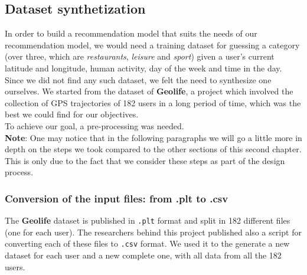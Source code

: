 \documentclass[../../main]{subfiles}
\begin{document}
\subsection{Dataset synthetization}
\label{ss:dataset-synthetization}

In order to build a recommendation model that suits the needs of our recommendation model, we would need a training dataset for guessing a category 
(over three, which are \textit{restaurants}, \textit{leisure} and \textit{sport}) given a user's current latitude and longitude, human activity, day of the week and time in the day.
Since we did not find any such dataset, we felt the need to synthesize one ourselves.
We started from the dataset of \textbf{Geolife}, a project which involved the collection of GPS trajectories of 182 users in a long period of time, which was the best we could find for our objectives.\\
To achieve our goal, a pre-processing was needed.\\
\textbf{Note}: One may notice that in the following paragraphs we will go a little more in depth on the steps we took compared to the other sections of this second chapter.
This is only due to the fact that we consider these steps as part of the design process.

\subsubsection{Conversion of the input files: from .plt to .csv}
\label{sss:conversion-input-files}
The \textbf{Geolife} dataset is published in \texttt{.plt} format and split in 182 different files (one for each user).
The researchers behind this project published also a script for converting each of these files to \texttt{.csv} format.
We used it to the generate a new dataset for each user and a new complete one, with all data from all the 182 users.
\end{document}
